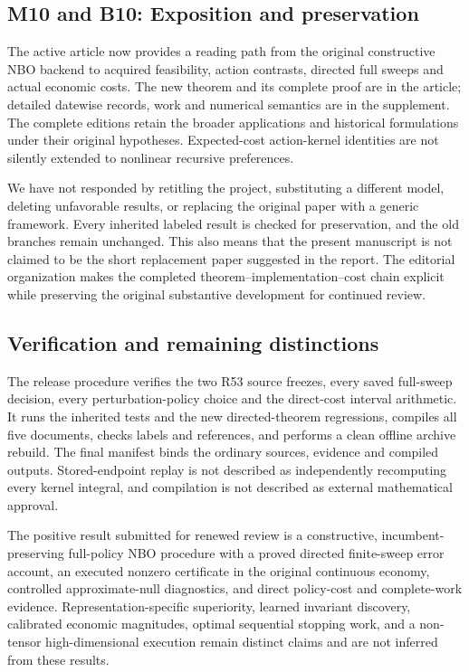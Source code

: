 \documentclass[ecta,nameyear,draft]{econsocart}
\begin{document}
\hypertarget{m10-and-b10-exposition-and-preservation}{%
\subsection{M10 and B10: Exposition and
preservation}\label{m10-and-b10-exposition-and-preservation}}

The active article now provides a reading path from the original
constructive NBO backend to acquired feasibility, action contrasts,
directed full sweeps and actual economic costs. The new theorem and its
complete proof are in the article; detailed datewise records, work and
numerical semantics are in the supplement. The complete editions retain
the broader applications and historical formulations under their
original hypotheses. Expected-cost action-kernel identities are not
silently extended to nonlinear recursive preferences.

We have not responded by retitling the project, substituting a different
model, deleting unfavorable results, or replacing the original paper
with a generic framework. Every inherited labeled result is checked for
preservation, and the old branches remain unchanged. This also means
that the present manuscript is not claimed to be the short replacement
paper suggested in the report. The editorial organization makes the
completed theorem--implementation--cost chain explicit while preserving
the original substantive development for continued review.

\hypertarget{verification-and-remaining-distinctions}{%
\subsection{Verification and remaining
distinctions}\label{verification-and-remaining-distinctions}}

The release procedure verifies the two R53 source freezes, every saved
full-sweep decision, every perturbation-policy choice and the
direct-cost interval arithmetic. It runs the inherited tests and the new
directed-theorem regressions, compiles all five documents, checks labels
and references, and performs a clean offline archive rebuild. The final
manifest binds the ordinary sources, evidence and compiled outputs.
Stored-endpoint replay is not described as independently recomputing
every kernel integral, and compilation is not described as external
mathematical approval.

The positive result submitted for renewed review is a constructive,
incumbent-preserving full-policy NBO procedure with a proved directed
finite-sweep error account, an executed nonzero certificate in the
original continuous economy, controlled approximate-null diagnostics,
and direct policy-cost and complete-work evidence.
Representation-specific superiority, learned invariant discovery,
calibrated economic magnitudes, optimal sequential stopping work, and a
non-tensor high-dimensional execution remain distinct claims and are not
inferred from these results.
\end{document}
